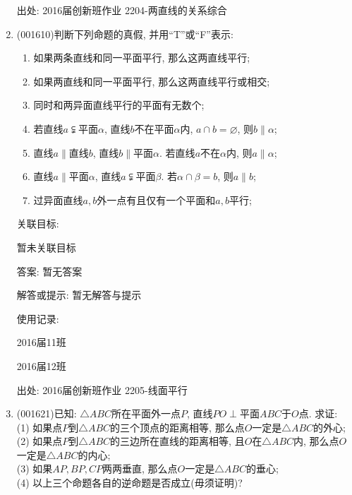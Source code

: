 \documentclass[10pt,a4paper]{article}
\newcommand{\blank}[1]{\underline{\hbox to #1pt{}}}
\begin{document}
\begin{enumerate}[1.]
出处: 2016届创新班作业	2204-两直线的关系综合
\item { (001610)}判断下列命题的真假, 并用``{\rm T}''或``{\rm F}''表示:
\begin{enumerate}[\blank{30}(1)]
\item 如果两条直线和同一平面平行, 那么这两直线平行;\\ 
\item 如果两直线和同一平面平行, 那么这两直线平行或相交;\\ 
\item 同时和两异面直线平行的平面有无数个;\\ 
\item 若直线$a\subsetneqq$平面$\alpha$, 直线$b$不在平面$\alpha$内, $a\cap b=\varnothing$, 则$b \parallel \alpha$;\\ 
\item 直线$a\parallel$直线$b$, 直线$b\parallel$平面$\alpha$. 若直线$a$不在$\alpha$内, 则$a\parallel \alpha$;\\ 
\item 直线$a\parallel$平面$\alpha$, 直线$a\subsetneqq$平面$\beta$. 若$\alpha\cap\beta=b$, 则$a\parallel b$;\\ 
\item 过异面直线$a,b$外一点有且仅有一个平面和$a,b$平行;\\ 
\end{enumerate}


关联目标:

暂未关联目标

答案: 暂无答案

解答或提示: 暂无解答与提示

使用记录:

2016届11班							

2016届12班							


出处: 2016届创新班作业	2205-线面平行
\item { (001621)}已知: $\triangle ABC$所在平面外一点$P$, 直线$PO\perp$平面$ABC$于$O$点. 求证:\\ 
(1) 如果点$P$到$\triangle ABC$的三个顶点的距离相等, 那么点$O$一定是$\triangle ABC$的外心;\\ 
(2) 如果点$P$到$\triangle ABC$的三边所在直线的距离相等, 且$O$在$\triangle ABC$内, 那么点$O$一定是$\triangle ABC$的内心;\\ 
(3) 如果$AP,BP,CP$两两垂直, 那么点$O$一定是$\triangle ABC$的垂心;\\ 
(4) 以上三个命题各自的逆命题是否成立(毋须证明)?



\end{enumerate}
\end{document}
